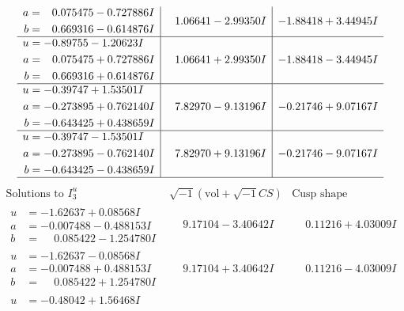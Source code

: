 \documentclass[1p]{elsarticle_modified}
\theoremstyle{definition}
\newcommand{\I}{\sqrt{-1}}
\begin{document}
$$\begin{array}{c|c|c}
\begin{aligned}
a &= \phantom{-}0.075475 - 0.727886 I \\
b &= \phantom{-}0.669316 - 0.614876 I\end{aligned}
 & \phantom{-}1.06641 - 2.99350 I & -1.88418 + 3.44945 I \\ \hline\begin{aligned}
u &= -0.89755 - 1.20623 I \\
a &= \phantom{-}0.075475 + 0.727886 I \\
b &= \phantom{-}0.669316 + 0.614876 I\end{aligned}
 & \phantom{-}1.06641 + 2.99350 I & -1.88418 - 3.44945 I \\ \hline\begin{aligned}
u &= -0.39747 + 1.53501 I \\
a &= -0.273895 + 0.762140 I \\
b &= -0.643425 + 0.438659 I\end{aligned}
 & \phantom{-}7.82970 - 9.13196 I & -0.21746 + 9.07167 I \\ \hline\begin{aligned}
u &= -0.39747 - 1.53501 I \\
a &= -0.273895 - 0.762140 I \\
b &= -0.643425 - 0.438659 I\end{aligned}
 & \phantom{-}7.82970 + 9.13196 I & -0.21746 - 9.07167 I\\
 \hline 
 \end{array}$$\newpage$$\begin{array}{c|c|c}  
\text{Solutions to }I^u_{3}& \I (\text{vol} + \sqrt{-1}CS) & \text{Cusp shape}\\
 \hline 
\begin{aligned}
u &= -1.62637 + 0.08568 I \\
a &= -0.007488 - 0.488153 I \\
b &= \phantom{-}0.085422 - 1.254780 I\end{aligned}
 & \phantom{-}9.17104 - 3.40642 I & \phantom{-}0.11216 + 4.03009 I \\ \hline\begin{aligned}
u &= -1.62637 - 0.08568 I \\
a &= -0.007488 + 0.488153 I \\
b &= \phantom{-}0.085422 + 1.254780 I\end{aligned}
 & \phantom{-}9.17104 + 3.40642 I & \phantom{-}0.11216 - 4.03009 I \\ \hline\begin{aligned}
u &= -0.48042 + 1.56468 I \\

\end{aligned}
\end{array}$$
\end{document}
